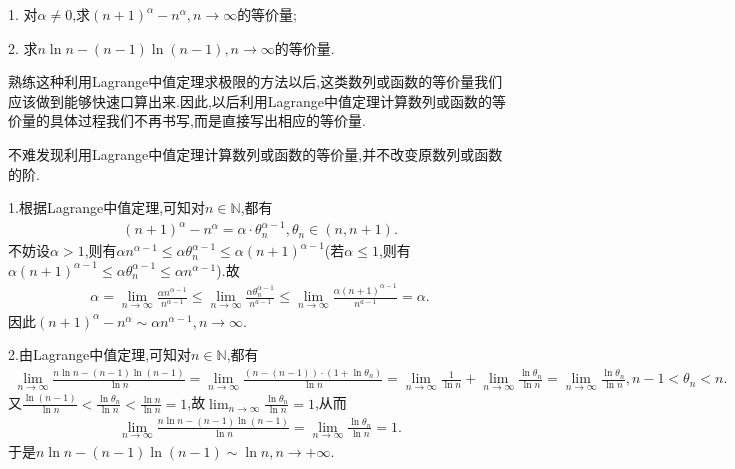 \documentclass[../../main.tex]{subfiles}%
\begin{document}
\begin{example}

1. 对\(\alpha \neq 0\),求\((n + 1)^{\alpha} - n^{\alpha}, n \to \infty\)的等价量;

2. 求\(n \ln n - (n - 1) \ln (n - 1), n \to \infty\)的等价量.
\end{example}
\begin{note}
熟练这种利用Lagrange中值定理求极限的方法以后,这类数列或函数的等价量我们应该做到能够快速口算出来.因此,以后利用Lagrange中值定理计算数列或函数的等价量的具体过程我们不再书写,而是直接写出相应的等价量.
\end{note}
\begin{remark}
不难发现利用Lagrange中值定理计算数列或函数的等价量,并不改变原数列或函数的阶.
\end{remark}
\begin{solution}

1.根据Lagrange中值定理,可知对$n\in\mathbb{N}$,都有
\begin{align*}
(n + 1)^{\alpha} - n^{\alpha}=\alpha\cdot\theta _{n}^{\alpha -1},\theta _{n}\in(n,n+1).
\end{align*}
不妨设$\alpha>1$,则有$\alpha n^{\alpha -1}\leqslant \alpha \theta _{n}^{\alpha -1}\leqslant \alpha \left( n+1 \right) ^{\alpha -1}$(若$\alpha\leqslant 1$,则有$\alpha \left( n+1 \right) ^{\alpha -1}\leqslant \alpha \theta _{n}^{\alpha -1}\leqslant \alpha n^{\alpha -1}$).故
\begin{align*}
\alpha =\lim_{n\rightarrow \infty} \frac{\alpha n^{\alpha -1}}{n^{\alpha -1}}\leqslant \lim_{n\rightarrow \infty} \frac{\alpha \theta _{n}^{\alpha -1}}{n^{a-1}}\leqslant \lim_{n\rightarrow \infty} \frac{\alpha (n+1)^{\alpha -1}}{n^{a-1}}=\alpha.
\end{align*}
因此$(n+1)^{\alpha}-n^{\alpha}\sim \alpha n^{\alpha -1},n\rightarrow \infty$.

2.由Lagrange中值定理,可知对$n\in\mathbb{N}$,都有
\begin{align*}
\lim_{n \to \infty} \frac{n \ln n - (n - 1) \ln (n - 1)}{\ln n} = \lim_{n \to \infty} \frac{(n - (n - 1)) \cdot (1 + \ln \theta_n)}{\ln n}= \lim_{n \to \infty} \frac{1}{\ln n} + \lim_{n \to \infty} \frac{\ln \theta_n}{\ln n}=\lim_{n \to \infty} \frac{\ln \theta_n}{\ln n}, n - 1 < \theta_n < n.
\end{align*}
又\(\frac{\ln (n - 1)}{\ln n} < \frac{\ln \theta_n}{\ln n} < \frac{\ln n}{\ln n} = 1\),故\(\lim_{n \to \infty} \frac{\ln \theta_n}{\ln n} = 1\),从而
\begin{align*}
\lim_{n \to \infty} \frac{n \ln n - (n - 1) \ln (n - 1)}{\ln n} = \lim_{n \to \infty} \frac{\ln \theta_n}{\ln n}=1.
\end{align*}
于是\(n \ln n - (n - 1) \ln (n - 1) \sim \ln n,n\to+\infty\).

\end{solution}
\end{document}
